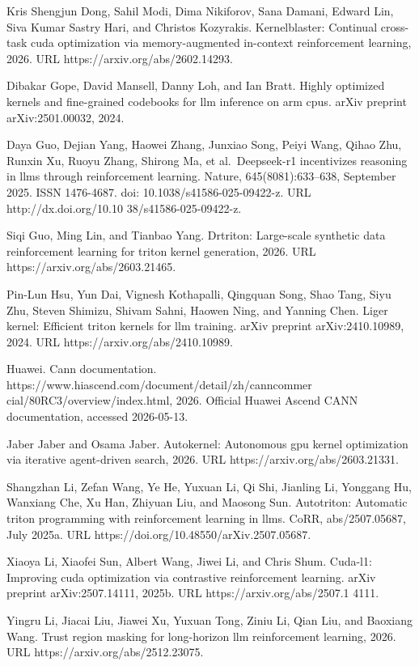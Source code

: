 \documentclass[
  10
]{article}
\begin{document}
Kris Shengjun Dong, Sahil Modi, Dima Nikiforov, Sana Damani, Edward Lin,
Siva Kumar Sastry Hari, and Christos Kozyrakis. Kernelblaster: Continual
cross-task cuda optimization via memory-augmented in-context
reinforcement learning, 2026. URL https://arxiv.org/abs/2602.14293.

Dibakar Gope, David Mansell, Danny Loh, and Ian Bratt. Highly optimized
kernels and fine-grained codebooks for llm inference on arm cpus. arXiv
preprint arXiv:2501.00032, 2024.

Daya Guo, Dejian Yang, Haowei Zhang, Junxiao Song, Peiyi Wang, Qihao
Zhu, Runxin Xu, Ruoyu Zhang, Shirong Ma, et al.~Deepseek-r1 incentivizes
reasoning in llms through reinforcement learning. Nature,
645(8081):633--638, September 2025. ISSN 1476-4687. doi:
10.1038/s41586-025-09422-z. URL http://dx.doi.org/10.10
38/s41586-025-09422-z.

Siqi Guo, Ming Lin, and Tianbao Yang. Drtriton: Large-scale synthetic
data reinforcement learning for triton kernel generation, 2026. URL
https://arxiv.org/abs/2603.21465.

Pin-Lun Hsu, Yun Dai, Vignesh Kothapalli, Qingquan Song, Shao Tang, Siyu
Zhu, Steven Shimizu, Shivam Sahni, Haowen Ning, and Yanning Chen. Liger
kernel: Efficient triton kernels for llm training. arXiv preprint
arXiv:2410.10989, 2024. URL https://arxiv.org/abs/2410.10989.

Huawei. Cann documentation.
https://www.hiascend.com/document/detail/zh/canncommer
cial/80RC3/overview/index.html, 2026. Official Huawei Ascend CANN
documentation, accessed 2026-05-13.

Jaber Jaber and Osama Jaber. Autokernel: Autonomous gpu kernel
optimization via iterative agent-driven search, 2026. URL
https://arxiv.org/abs/2603.21331.

Shangzhan Li, Zefan Wang, Ye He, Yuxuan Li, Qi Shi, Jianling Li,
Yonggang Hu, Wanxiang Che, Xu Han, Zhiyuan Liu, and Maosong Sun.
Autotriton: Automatic triton programming with reinforcement learning in
llms. CoRR, abs/2507.05687, July 2025a. URL
https://doi.org/10.48550/arXiv.2507.05687.

Xiaoya Li, Xiaofei Sun, Albert Wang, Jiwei Li, and Chris Shum. Cuda-l1:
Improving cuda optimization via contrastive reinforcement learning.
arXiv preprint arXiv:2507.14111, 2025b. URL https://arxiv.org/abs/2507.1
4111.

Yingru Li, Jiacai Liu, Jiawei Xu, Yuxuan Tong, Ziniu Li, Qian Liu, and
Baoxiang Wang. Trust region masking for long-horizon llm reinforcement
learning, 2026. URL https://arxiv.org/abs/2512.23075.
\end{document}
